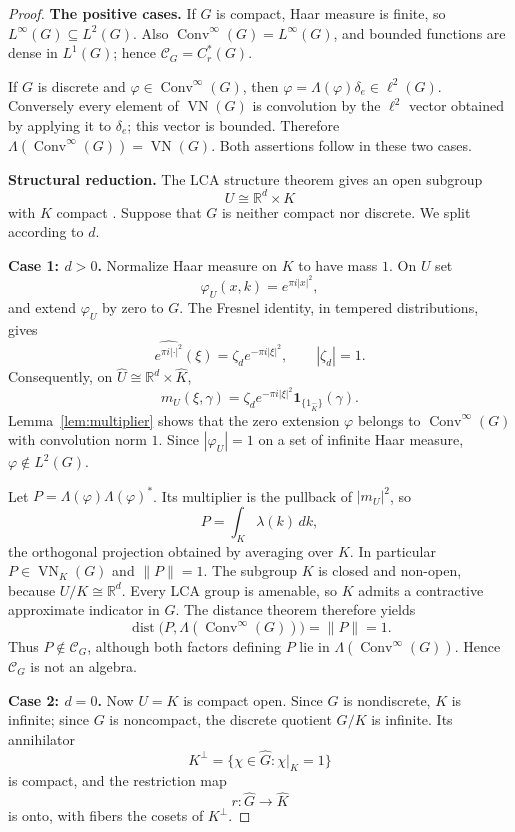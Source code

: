 \documentclass[11pt]{article}
\newcommand{\Conv}{\operatorname{Conv}^{\infty}}
\newcommand{\VN}{\operatorname{VN}}
\newcommand{\one}{\mathbf 1}
\begin{document}
\begin{proof}
\textbf{The positive cases.}
If $G$ is compact, Haar measure is finite, so $L^\infty(G)\subseteq L^2(G)$.
Also $\Conv(G)=L^\infty(G)$, and bounded functions are dense in $L^1(G)$;
hence $\mathcal C_G=C_r^*(G)$.

If $G$ is discrete and $\varphi\in\Conv(G)$, then
$\varphi=\Lambda(\varphi)\delta_e\in\ell^2(G)$.  Conversely every element of
$\VN(G)$ is convolution by the $\ell^2$ vector obtained by applying it to
$\delta_e$; this vector is bounded.  Therefore
$\Lambda(\Conv(G))=\VN(G)$.  Both assertions follow in these two cases.

\medskip
\textbf{Structural reduction.}
The LCA structure theorem gives an open subgroup
\[
 U\cong\mathbb R^d\times K
\]
with $K$ compact \cite{HR}.  Suppose that $G$ is neither compact nor discrete.
We split according to $d$.

\medskip
\textbf{Case 1: $d>0$.}
Normalize Haar measure on $K$ to have mass $1$.  On $U$ set
\[
 \varphi_U(x,k)=e^{\pi i|x|^2},
\]
and extend $\varphi_U$ by zero to $G$.  The Fresnel identity, in tempered
distributions, gives
\[
 \widehat{e^{\pi i|\cdot|^2}}(\xi)
   =\zeta_d e^{-\pi i|\xi|^2},\qquad |\zeta_d|=1.
\]
Consequently, on
$\widehat U\cong\mathbb R^d\times\widehat K$,
\[
 m_U(\xi,\gamma)
 =\zeta_d e^{-\pi i|\xi|^2}\one_{\{1_{\widehat K}\}}(\gamma).
\]
Lemma~\ref{lem:multiplier} shows that the zero extension $\varphi$ belongs to
$\Conv(G)$ with convolution norm $1$.  Since $|\varphi_U|=1$ on a set of
infinite Haar measure, $\varphi\notin L^2(G)$.

Let $P=\Lambda(\varphi)\Lambda(\varphi)^*$.  Its multiplier is the pullback
of $|m_U|^2$, so
\[
 P=\int_K\lambda(k)\,dk,
\]
the orthogonal projection obtained by averaging over $K$.  In particular
$P\in\VN_K(G)$ and $\|P\|=1$.  The subgroup $K$ is closed and non-open,
because $U/K\cong\mathbb R^d$.  Every LCA group is amenable, so $K$ admits a
contractive approximate indicator in $G$.  The distance theorem
\cite[Theorem~3.1]{FSW} therefore yields
\[
 \operatorname{dist}\bigl(P,\Lambda(\Conv(G))\bigr)=\|P\|=1.
\]
Thus $P\notin\mathcal C_G$, although both factors defining $P$ lie in
$\Lambda(\Conv(G))$.  Hence $\mathcal C_G$ is not an algebra.

\medskip
\textbf{Case 2: $d=0$.}
Now $U=K$ is compact open.  Since $G$ is nondiscrete, $K$ is infinite; since
$G$ is noncompact, the discrete quotient $G/K$ is infinite.  Its annihilator
\[
 K^\perp=\{\chi\in\widehat G:\chi|_K=1\}
\]
is compact, and the restriction map
\[
 r:\widehat G\longrightarrow\widehat K
\]
is onto, with fibers the cosets of $K^\perp$.


\end{proof}
\end{document}
